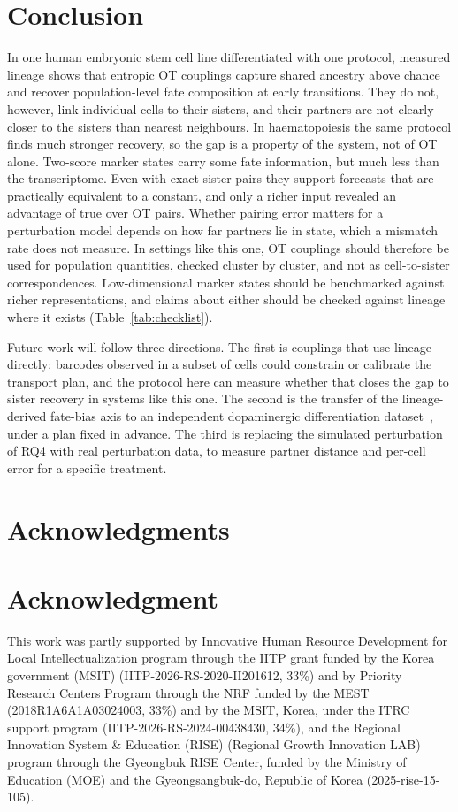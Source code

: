 \documentclass[10pt,journal,compsoc]{IEEEtran}
\begin{document}
\section{Conclusion}\label{sec:conclusion}
In one human embryonic stem cell line differentiated with one protocol, measured lineage
shows that entropic OT couplings capture shared ancestry above chance and recover
population-level fate composition at early transitions. They do not, however, link
individual cells to their sisters, and their partners are not clearly closer to the sisters
than nearest neighbours. In haematopoiesis the same protocol finds much stronger recovery, so
the gap is a property of the system, not of OT alone. Two-score marker states carry some
fate information, but much less than the transcriptome. Even with exact sister pairs they
support forecasts that are practically equivalent to a constant, and only a richer input
revealed an advantage of true over OT pairs. Whether pairing error matters for a
perturbation model depends on how far partners lie in state, which a mismatch rate does not
measure. In settings like this one, OT couplings should therefore be used for population
quantities, checked cluster by cluster, and not as cell-to-sister correspondences.
Low-dimensional marker states should be benchmarked against richer representations, and
claims about either should be checked against lineage where it exists
(Table~\ref{tab:checklist}).

Future work will follow three directions. The first is couplings that use lineage directly:
barcodes observed in a subset of cells could constrain or calibrate the transport plan, and
the protocol here can measure whether that closes the gap to sister recovery in systems
like this one. The second is the transfer of the lineage-derived fate-bias axis to an
independent dopaminergic differentiation dataset~\cite{Jerber_2021}, under a plan fixed in
advance. The third is replacing the simulated perturbation of RQ4 with real perturbation
data, to measure partner distance and per-cell error for a specific treatment.

\ifCLASSOPTIONcompsoc
  \section*{Acknowledgments}
\else
  \section*{Acknowledgment}
\fi
This work was partly supported by Innovative Human Resource Development for Local Intellectualization program through the IITP grant funded by the Korea government (MSIT) (IITP-2026-RS-2020-II201612, 33\%) and by Priority Research Centers Program through the NRF funded by the MEST (2018R1A6A1A03024003, 33\%) and by the MSIT, Korea, under the ITRC support program (IITP-2026-RS-2024-00438430, 34\%),  and the Regional Innovation System \& Education (RISE) (Regional Growth Innovation LAB) program through the Gyeongbuk RISE Center, funded by the Ministry of Education (MOE) and the Gyeongsangbuk-do, Republic of Korea (2025-rise-15-105).
\end{document}
